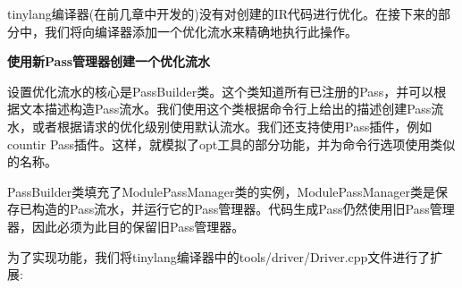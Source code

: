 
tinylang编译器(在前几章中开发的)没有对创建的IR代码进行优化。在接下来的部分中，我们将向编译器添加一个优化流水来精确地执行此操作。\par

\hspace*{\fill} \par %
\textbf{使用新Pass管理器创建一个优化流水}

设置优化流水的核心是PassBuilder类。这个类知道所有已注册的Pass，并可以根据文本描述构造Pass流水。我们使用这个类根据命令行上给出的描述创建Pass流水，或者根据请求的优化级别使用默认流水。我们还支持使用Pass插件，例如countir Pass插件。这样，就模拟了opt工具的部分功能，并为命令行选项使用类似的名称。\par

PassBuilder类填充了ModulePassManager类的实例，ModulePassManager类是保存已构造的Pass流水，并运行它的Pass管理器。代码生成Pass仍然使用旧Pass管理器，因此必须为此目的保留旧Pass管理器。 \par

为了实现功能，我们将tinylang编译器中的tools/driver/Driver.cpp文件进行了扩展:\par

